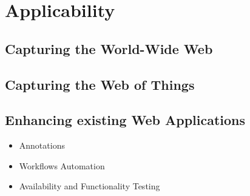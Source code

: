 \chapter{Applicability}
\section{Capturing the World-Wide Web}
\section{Capturing the Web of Things}
\section{Enhancing existing Web Applications}
\begin{itemize}
	\item Annotations
	\item Workflows Automation
	\item Availability and Functionality Testing
\end{itemize}